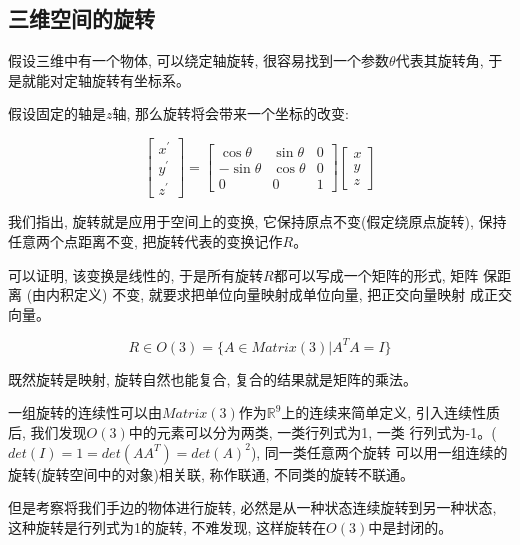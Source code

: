 \documentclass{ctexart}
\numberwithin{equation}{subsection}
\numberwithin{theorem}{subsection}
\numberwithin{definition}{subsection}
\numberwithin{proof}{subsection}
\numberwithin{lemma}{subsection}
\numberwithin{example}{subsection}
\numberwithin{remark}{subsection}
\numberwithin{corollary}{subsection}
\numberwithin{exercise}{subsection}
\numberwithin{problem}{subsection}
\numberwithin{question}{section}
\numberwithin{method}{subsection}
\begin{document}
    \subsection{三维空间的旋转}

    假设三维中有一个物体, 可以绕定轴旋转, 很容易找到一个参数$\theta$代表其旋转角,
    于是就能对定轴旋转有坐标系。

    假设固定的轴是$z$轴, 那么旋转将会带来一个坐标的改变:

    \begin{equation}
        \begin{bmatrix}
            x^\prime \\ y^\prime \\ z^\prime
        \end{bmatrix}
        = \begin{bmatrix}
            \cos\theta & \sin\theta & 0 \\
            -\sin\theta & \cos\theta & 0 \\
            0 & 0 & 1
        \end{bmatrix}
        \begin{bmatrix}
            x \\ y \\ z
        \end{bmatrix}
    \end{equation}

    我们指出, 旋转就是应用于空间上的变换, 它保持原点不变(假定绕原点旋转), 
    保持任意两个点距离不变, 把旋转代表的变换记作$R$。

    可以证明, 该变换是线性的, 于是所有旋转$R$都可以写成一个矩阵的形式, 矩阵
    保距离 (由内积定义) 不变, 就要求把单位向量映射成单位向量, 把正交向量映射
    成正交向量。

    \begin{equation}
        R \in O(3) = \{A \in Matrix(3) | A^T A = I\}
    \end{equation}

    既然旋转是映射, 旋转自然也能复合, 复合的结果就是矩阵的乘法。
    
    一组旋转的连续性可以由$Matrix(3)$作为$\mathbb{R}^9$上的连续来简单定义,
    引入连续性质后, 我们发现$O(3)$中的元素可以分为两类, 一类行列式为1, 一类
    行列式为-1。($det(I) = 1 = det(AA^T) = det(A) ^2$), 同一类任意两个旋转
    可以用一组连续的旋转(旋转空间中的对象)相关联, 称作联通, 不同类的旋转不联通。
    
    但是考察将我们手边的物体进行旋转, 必然是从一种状态连续旋转到另一种状态, 
    这种旋转是行列式为1的旋转, 不难发现, 这样旋转在$O(3)$中是封闭的。
\end{document}
